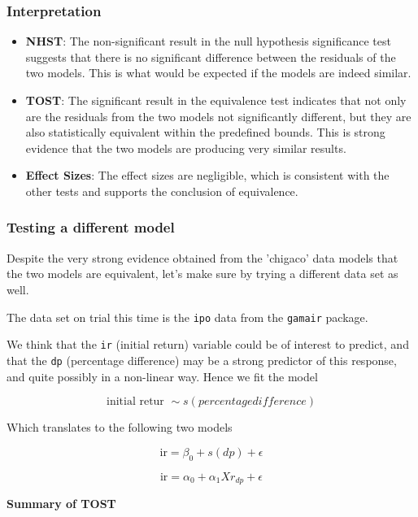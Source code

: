 \subsubsection{Interpretation}

\begin{itemize}
    \item \textbf{NHST}: The non-significant result in the null hypothesis significance test suggests that there is no significant difference between the residuals of the two models. This is what would be expected if the models are indeed similar.
    
    \item \textbf{TOST}: The significant result in the equivalence test indicates that not only are the residuals from the two models not significantly different, but they are also statistically equivalent within the predefined bounds. This is strong evidence that the two models are producing very similar results.
    
    \item \textbf{Effect Sizes}: The effect sizes are negligible, which is consistent with the other tests and supports the conclusion of equivalence.
\end{itemize}

\subsubsection{Testing a different model}
Despite the very strong evidence obtained from the 'chigaco' data models that the two models are equivalent, let's make sure by trying a different data set as well. 

The data set on trial this time is the \texttt{ipo} data from the \texttt{gamair} package. 

We think that the \texttt{ir} (initial return) variable could be of interest to predict, and that the \texttt{dp} (percentage difference) may be a strong predictor of this response, and quite possibly in a non-linear way. Hence we fit the model

\[
\text{initial retur } \sim s(percentage difference)
\]

Which translates to the following two models
   
    \[
    \text{ir} = \beta_0 + s(dp) + \epsilon
    \]
    
    
    \[
    \text{ir} = \alpha_0 + \alpha_1 Xr_{dp} + \epsilon
    \]

\textbf{Summary of TOST}

